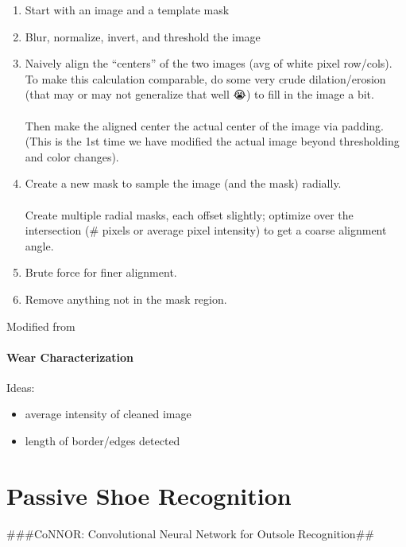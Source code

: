 \documentclass[]{book}
\providecommand{\tightlist}{%
  \setlength{\itemsep}{0pt}\setlength{\parskip}{0pt}}
\let\oldparagraph\paragraph
\renewcommand{\paragraph}[1]{\oldparagraph{#1}\mbox{}}
\begin{document}
\begin{enumerate}
\def\labelenumi{\arabic{enumi}.}
\item
  Start with an image and a template mask
\item
  Blur, normalize, invert, and threshold the image\\
\item
  Naively align the ``centers'' of the two images (avg of white pixel row/cols). To make this calculation comparable, do some very crude dilation/erosion (that may or may not generalize that well 😭) to fill in the image a bit.\\
  ~\\
  Then make the aligned center the actual center of the image via padding. (This is the 1st time we have modified the actual image beyond thresholding and color changes).
\item
  Create a new mask to sample the image (and the mask) radially.\\
  ~\\
  Create multiple radial masks, each offset slightly; optimize over the intersection (\# pixels or average pixel intensity) to get a coarse alignment angle.
\item
  Brute force for finer alignment.
\item
  Remove anything not in the mask region.
\end{enumerate}

Modified from \citep{kimGrayscaleTemplateMatchingInvariant2007}

\hypertarget{lss-paper-analysis-wear}{%
\paragraph{Wear Characterization}\label{lss-paper-analysis-wear}}

Ideas:

\begin{itemize}
\tightlist
\item
  average intensity of cleaned image
\item
  length of border/edges detected
\end{itemize}

\hypertarget{connor}{%
\section{Passive Shoe Recognition}\label{connor}}

\#\#\#CoNNOR: Convolutional Neural Network for Outsole Recognition\#\#
\end{document}
